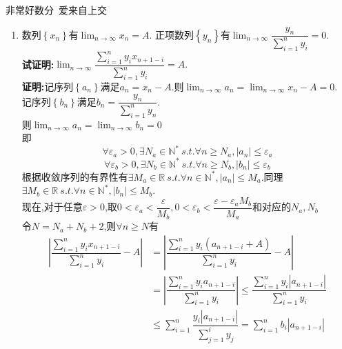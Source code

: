\documentclass[a4paper,oneside]{ctexart}
\begin{document}
\pagestyle{empty}
\begin{center}\large 非常好数分\ 爱来自上交\end{center}
\begin{enumerate}[1.]
    \item 数列$\left\{ x_n\right\}$有$\displaystyle\lim_{n\to\infty}{x_n}=A$.
          正项数列$\left\{ y_n\right\}$有$\displaystyle\lim_{n\to\infty}\dfrac{y_n}{\sum_{i=1}^{n}{y_i}}=0$.\\
          \textbf{试证明:}$\displaystyle\lim_{n\to\infty}{\dfrac{\sum_{i=1}^{n}{y_ix_{n+1-i}}}{\sum_{i=1}^{n}{y_i}}}=A.$\\
          \textbf{证明:}记序列$\left\{ a_n\right\}$满足$a_n=x_n-A$.则$\displaystyle\lim_{n\to\infty}{a_n}=\lim_{n\to\infty}{x_n}-A=0$.\\
          记序列$\left\{ b_n\right\}$满足$\displaystyle b_n=\dfrac{y_n}{\sum_{i=1}^{n}{y_n}}$.\\
          则$\displaystyle\lim_{n\to\infty}{a_n}=\lim_{n\to\infty}{b_n}=0$\\
          即$$\forall \varepsilon_a>0,\exists N_a\in\mathbb{N}^*\ s.t.\forall n\geqslant N_a,\left\lvert a_n\right\rvert\leqslant\varepsilon_a$$
          $$\forall \varepsilon_b>0,\exists N_b\in\mathbb{N}^*\ s.t.\forall n\geqslant N_b,\left\lvert b_n\right\rvert\leqslant\varepsilon_b$$
          根据收敛序列的有界性有$\exists M_a\in\mathbb{R}\ s.t.\forall n\in\mathbb{N}^*,\left\lvert a_n\right\rvert\leqslant M_a$.同理$\exists M_b\in\mathbb{R}\ s.t.\forall n\in\mathbb{N}^*,\left\lvert b_n\right\rvert\leqslant M_b$.\\
          现在,对于任意$\varepsilon>0$,取$0<\varepsilon_a<\dfrac{\varepsilon}{M_b},0<\varepsilon_b<\dfrac{\varepsilon-\varepsilon_aM_b}{M_a}$和对应的$N_a,N_b$\\
          令$N=N_a+N_b+2$,则$\forall n\geqslant N$有
          $$\begin{aligned}
            \left|\dfrac{\sum_{i=1}^{n}{y_ix_{n+1-i}}}{\sum_{i=1}^{n}{y_i}}-A\right|
            &= \left|\dfrac{\sum_{i=1}^{n}{y_i(a_{n+1-i}+A)}}{\sum_{i=1}^{n}{y_i}}-A\right| \\
            &= \left|\dfrac{\sum_{i=1}^{n}{y_ia_{n+1-i}}}{\sum_{i=1}^{n}{y_i}}\right| 
            \leqslant \dfrac{\sum_{i=1}^{n}{y_i\left|a_{n+1-i}\right|}}{\sum_{i=1}^{n}{y_i}} \\
            &\leqslant \sum_{i=1}^{n}{\dfrac{y_i\left| a_{n+1-i}\right|}{\sum_{j=1}^{i}{y_j}}}
            =\sum_{i=1}^{n}{b_i\left| a_{n+1-i}\right|} \\

\end{aligned}$$
\end{enumerate}
\end{document}
